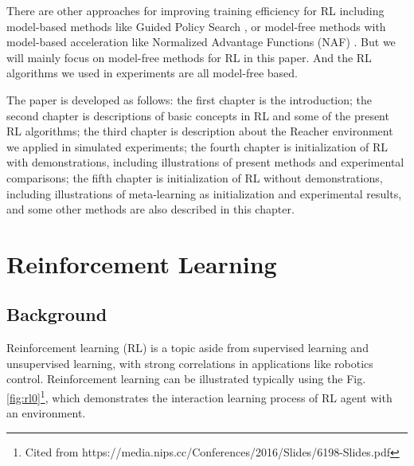 \documentclass{article}
\begin{document}
There are other approaches for improving training efficiency for RL including model-based methods like Guided Policy Search \cite{levine2013guided}, or model-free methods with model-based acceleration like Normalized Advantage Functions (NAF) \cite{gu2016continuous}. But we will mainly focus on model-free methods for RL in this paper. And the RL algorithms we used in experiments are all model-free based.

The paper is developed as follows: the first chapter is the introduction; the second chapter is descriptions of basic concepts in RL and some of the present RL algorithms; the third chapter is description about the {Reacher} environment we applied in simulated experiments; the fourth chapter is initialization of RL with demonstrations, including illustrations of present methods and experimental comparisons; the fifth chapter is initialization of RL without demonstrations, including illustrations of meta-learning as initialization and experimental results, and some other methods are also described in this chapter.


\section{Reinforcement Learning}
\subsection{Background}\label{Background}
Reinforcement learning (RL) \cite{sutton2018reinforcement}\cite{arulkumaran2017brief} is a topic aside from supervised learning and unsupervised learning, with strong correlations in applications like robotics control. Reinforcement learning can be illustrated typically using the Fig. \ref{fig:rl0}\footnote{Cited from https://media.nips.cc/Conferences/2016/Slides/6198-Slides.pdf}, which demonstrates the interaction learning process of RL agent with an environment. 
\end{document}
